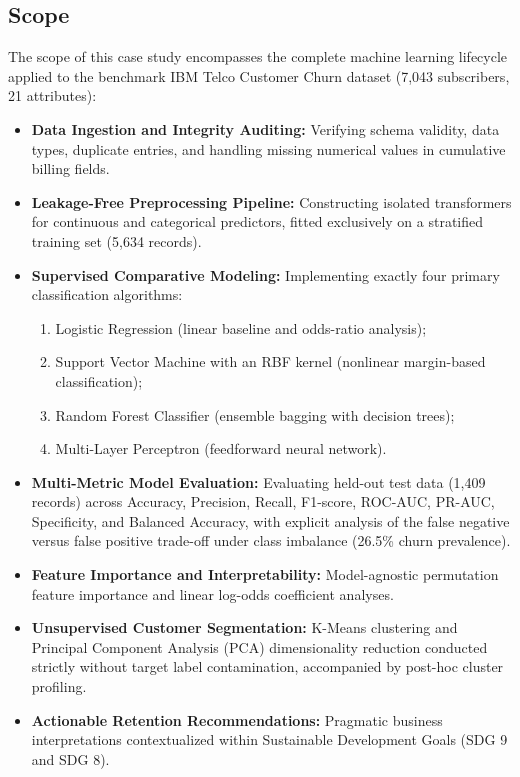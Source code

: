 \documentclass[12pt,a4paper]{report}
\newcommand{\datasetTotalRows}{7,043}
\newcommand{\datasetTotalCols}{21}
\newcommand{\datasetChurnProportion}{26.5\%}
\newcommand{\datasetTrainCount}{5,634}
\newcommand{\datasetTestCount}{1,409}
\begin{document}
\subsection{Scope}
The scope of this case study encompasses the complete machine learning lifecycle applied to the benchmark IBM Telco Customer Churn dataset (\datasetTotalRows{} subscribers, \datasetTotalCols{} attributes):
\begin{itemize}
    \item \textbf{Data Ingestion and Integrity Auditing:} Verifying schema validity, data types, duplicate entries, and handling missing numerical values in cumulative billing fields.
    \item \textbf{Leakage-Free Preprocessing Pipeline:} Constructing isolated transformers for continuous and categorical predictors, fitted exclusively on a stratified training set (\datasetTrainCount{} records).
    \item \textbf{Supervised Comparative Modeling:} Implementing exactly four primary classification algorithms:
    \begin{enumerate}
        \item Logistic Regression (linear baseline and odds-ratio analysis);
        \item Support Vector Machine with an RBF kernel (nonlinear margin-based classification);
        \item Random Forest Classifier (ensemble bagging with decision trees);
        \item Multi-Layer Perceptron (feedforward neural network).
    \end{enumerate}
    \item \textbf{Multi-Metric Model Evaluation:} Evaluating held-out test data (\datasetTestCount{} records) across Accuracy, Precision, Recall, F1-score, ROC-AUC, PR-AUC, Specificity, and Balanced Accuracy, with explicit analysis of the false negative versus false positive trade-off under class imbalance (\datasetChurnProportion{} churn prevalence).
    \item \textbf{Feature Importance and Interpretability:} Model-agnostic permutation feature importance and linear log-odds coefficient analyses.
    \item \textbf{Unsupervised Customer Segmentation:} K-Means clustering and Principal Component Analysis (PCA) dimensionality reduction conducted strictly without target label contamination, accompanied by post-hoc cluster profiling.
    \item \textbf{Actionable Retention Recommendations:} Pragmatic business interpretations contextualized within Sustainable Development Goals (SDG 9 and SDG 8).
\end{itemize}
\end{document}

